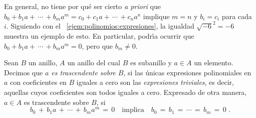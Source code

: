 \begin{obsPolinomios}\label{obs:polinomios:trascendente}
	En general, no tiene por qu\'e ser cierto \emph{a priori} que
	\begin{math}
		b_0+b_1a+\,\cdots\,+b_ma^m= c_0+c_1a+\,\cdots\,+c_na^n
	\end{math}
	implique $m=n$ y $b_i=c_i$ para cada $i$.
	Siguiendo con el \ejemname~\ref{ejem:polinomios:expresiones},
	la igualdad $\sqrt{-6}^2=-6$ muestra un ejemplo de esto.
	En particular, podr\'{\i}a ocurrir que
	\begin{math}
		b_0+b_1a+\,\cdots\,+b_ma^m=0
	\end{math},
	pero que $b_m\neq 0$.
\end{obsPolinomios}

\begin{defPolinomios}\label{def:polinomios:trascendente}
	Sean $B$ un anillo, $A$ un anillo del cual $B$ es subanillo y
	$a\in A$ un elemento.
	Decimos que \emph{$a$ es trascendente sobre $B$}, si las \'unicas
	expresiones polinomiales en $a$ con coeficientes en $B$ iguales a cero
	son las \emph{expresiones triviales}, es decir, aquellas cuyos
	coeficientes son todos iguales a cero.
	Expresado de otra manera, $a\in A$ es trascendente sobre $B$, si
	\begin{displaymath}
		b_0\,+\,b_1a\,+\,\cdots\,+\,b_ma^m\,=\,0
		\quad\text{implica}\quad b_0\,=\,b_1\,=\,\cdots\,=\,b_m\,=\,0
		\text{ .}
	\end{displaymath}
\end{defPolinomios}

